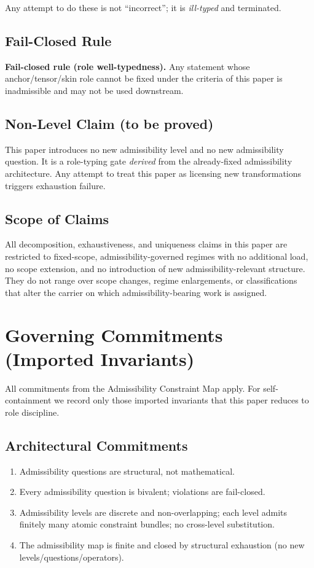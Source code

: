 \documentclass[12pt]{article}
\theoremstyle{plain}
\begin{document}
Any attempt to do these is not ``incorrect''; it is \emph{ill-typed} and terminated.

\subsection{Fail-Closed Rule}

\textbf{Fail-closed rule (role well-typedness).} Any statement whose anchor/tensor/skin role cannot be fixed under the criteria of this paper is inadmissible and may not be used downstream.

\subsection{Non-Level Claim (to be proved)}

This paper introduces no new admissibility level and no new admissibility question. It is a role-typing gate \emph{derived} from the already-fixed admissibility architecture. Any attempt to treat this paper as licensing new transformations triggers exhaustion failure.

\subsection{Scope of Claims}

All decomposition, exhaustiveness, and uniqueness claims in this paper are restricted to fixed-scope, admissibility-governed regimes with no additional load, no scope extension, and no introduction of new admissibility-relevant structure. They do not range over scope changes, regime enlargements, or classifications that alter the carrier on which admissibility-bearing work is assigned.

\section{Governing Commitments (Imported Invariants)}

All commitments from the Admissibility Constraint Map apply. For self-containment we record only those imported invariants that this paper reduces to role discipline.

\subsection{Architectural Commitments}

\begin{enumerate}[leftmargin=*]
\item Admissibility questions are structural, not mathematical.
\item Every admissibility question is bivalent; violations are fail-closed.
\item Admissibility levels are discrete and non-overlapping; each level admits finitely many atomic constraint bundles; no cross-level substitution.
\item The admissibility map is finite and closed by structural exhaustion (no new levels/questions/operators).
\end{enumerate}
\end{document}
